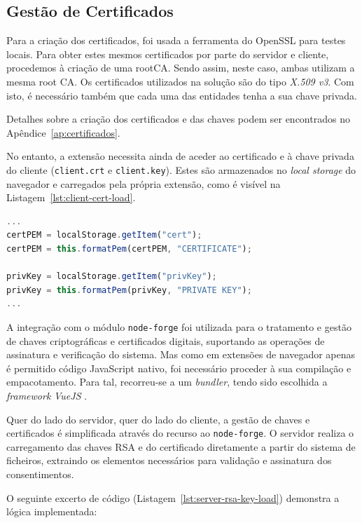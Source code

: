 \subsection{Gestão de Certificados}
Para a criação dos certificados, foi usada a ferramenta do OpenSSL para testes locais. Para obter estes mesmos certificados por parte do servidor e cliente, procedemos à criação de uma rootCA. Sendo assim, neste caso, ambas utilizam a mesma root CA. Os certificados utilizados na solução são do tipo \textit{X.509 v3}. Com isto, é necessário também que cada uma das entidades tenha a sua chave privada.

Detalhes sobre a criação dos certificados e das chaves podem ser encontrados no Apêndice~\ref{ap:certificados}.

No entanto, a extensão necessita ainda de aceder ao certificado e à chave privada do cliente (\texttt{client.crt} e \texttt{client.key}). Estes são armazenados no \textit{local storage} do navegador e carregados pela própria extensão, como é visível na Listagem~\ref{lst:client-cert-load}.

\begin{lstlisting}[language=Javascript, caption={Carregamento do certificado e da chave privada do cliente a partir do \textit{local storage}}, label={lst:client-cert-load}]
...
certPEM = localStorage.getItem("cert");
certPEM = this.formatPem(certPEM, "CERTIFICATE");

privKey = localStorage.getItem("privKey");
privKey = this.formatPem(privKey, "PRIVATE KEY");
...
\end{lstlisting}

A integração com o módulo \texttt{node-forge} foi utilizada para o tratamento e gestão de chaves criptográficas e certificados digitais, suportando as operações de assinatura e verificação do sistema. Mas como em extensões de navegador apenas é permitido código JavaScript nativo, foi necessário proceder à sua compilação e empacotamento. Para tal, recorreu-se a um \textit{bundler}, tendo sido escolhida a \textit{framework} \textit{VueJS} \citep{VueJS}.

Quer do lado do servidor, quer do lado do cliente, a gestão de chaves e certificados é simplificada através do recurso ao \texttt{node-forge}. O servidor realiza o carregamento das chaves RSA e do certificado diretamente a partir do sistema de ficheiros, extraindo os elementos necessários para validação e assinatura dos consentimentos.

O seguinte excerto de código (Listagem~\ref{lst:server-rsa-key-load}) demonstra a lógica implementada:

